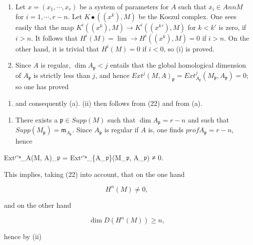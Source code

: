 \documentclass[
]{article}
\newenvironment{Shaded}{}{}
\newcommand{\NormalTok}[1]{#1}
\providecommand{\tightlist}{%
  \setlength{\itemsep}{0pt}\setlength{\parskip}{0pt}}
\begin{document}
\begin{enumerate}
\def\labelenumi{(\roman{enumi})}
\item
  Let \(x = (x_{1}, \cdots, x_{r})\) be a system of parameters for \(A\)
  such that \(x_{i} \in Ann M\) for \(i = 1, \cdots, r - n\). Let
  \(K\bullet((x^{k}), M)\) be the Koszul complex. One sees easily that
  the map \(K^{i}((x^{k}), M) \to K^{i}(({x^{k}}'), M)\) for \(k < k'\)
  is zero, if \(i > n\). It follows that
  \(H^{i}(M) = \lim\to H^{i}((x^{k}), M) = 0\) if \(i > n\). On the
  other hand, it is trivial that \(H^{i}(M) = 0\) if \(i < 0\), so (i)
  is proved.
\item
  Since \(A\) is regular, \(\dim A_{\mathfrak{p}} < j\) entails that the
  global homological dimension of \(A_{\mathfrak{p}}\) is strictly less
  than \(j\), and hence
  \(Ext^{j}(M, A)_{\mathfrak{p}} = Ext^{j}_{A_{\mathfrak{p}}}(M_{\mathfrak{p}}, A_{\mathfrak{p}}) = 0\);
  so one has proved
\end{enumerate}

\begin{enumerate}
\def\labelenumi{(\alph{enumi})}
\setcounter{enumi}{1}
\tightlist
\item
  and consequently (a). (ii) then follows from (22) and from (a).
\end{enumerate}

\begin{enumerate}
\def\labelenumi{(\roman{enumi})}
\setcounter{enumi}{2}
\tightlist
\item
  There exists a \(\mathfrak{p} \in Supp(M)\) such that
  \(\dim A_{\mathfrak{p}} = r - n\) and such that
  \(Supp(M_{\mathfrak{p}}) = {\mathfrak{m}_{A_{\mathfrak{p}}}}\). Since
  \(A_{\mathfrak{p}}\) is regular if \(A\) is, one finds
  \(prof A_{\mathfrak{p}} = r - n\), hence
\end{enumerate}

\begin{Shaded}
\begin{Highlighting}[]
\NormalTok{Extʳ⁻ⁿ\_A(M, A)\_𝔭 = Extʳ⁻ⁿ\_\{A\_𝔭\}(M\_𝔭, A\_𝔭) ≠ 0.}
\end{Highlighting}
\end{Shaded}

This implies, taking (22) into account, that on the one hand

\[
H^{n}(M) \neq 0,
\]

and on the other hand

\[
\dim D(H^{n}(M)) \geqslant n,
\]

hence by (ii)
\end{document}
